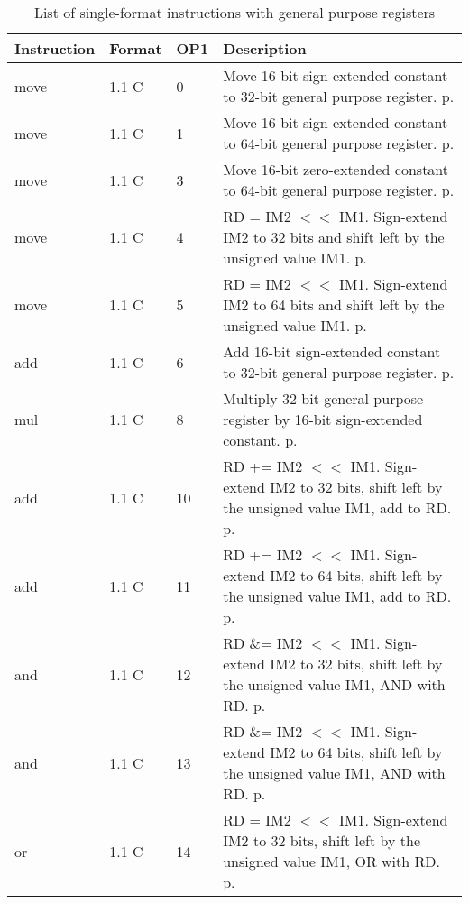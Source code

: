 \documentclass[forwardcom.tex]{subfiles}
\begin{document}
\begin{longtable} {|p{25mm}|p{14mm}|p{10mm}|p{95mm}|}
\caption{List of single-format instructions with general purpose registers} 
\label{table:ListOfSingleFormatInstructionsGP} \\
\endfirsthead
\endhead
\hline
\bfseries Instruction & \bfseries Format &\bfseries OP1 & \bfseries Description \\
\hline
move          & 1.1 C &  0 & Move 16-bit sign-extended constant to 32-bit general purpose register. p. \pageref{table:moveInstruction}\\
move          & 1.1 C &  1 & Move 16-bit sign-extended constant to 64-bit general purpose register. p. \pageref{table:moveInstruction} \\
move          & 1.1 C &  3 & Move 16-bit zero-extended constant to 64-bit general purpose register. p. \pageref{table:moveInstruction} \\
move          & 1.1 C & 4  & RD = IM2 $<<$ IM1. Sign-extend IM2 to 32 bits and shift left by the unsigned value IM1. p. \pageref{table:moveInstruction} \\
move          & 1.1 C & 5  & RD = IM2 $<<$ IM1. Sign-extend IM2 to 64 bits and shift left by the unsigned value IM1. p. \pageref{table:moveInstruction} \\
add           & 1.1 C &  6  & Add 16-bit sign-extended constant to 32-bit general purpose register. p. \pageref{table:addInstruction} \\
mul           & 1.1 C &  8  & Multiply 32-bit general purpose register by 16-bit sign-extended constant. p. \pageref{table:mulInstruction} \\
add           & 1.1 C & 10  & RD += IM2 $<<$ IM1. Sign-extend IM2 to 32 bits, shift left by the unsigned value IM1, add to RD. p. \pageref{table:addInstruction}\\
add           & 1.1 C & 11  & RD += IM2 $<<$ IM1. Sign-extend IM2 to 64 bits, shift left by the unsigned value IM1, add to RD. p. \pageref{table:addInstruction} \\
and           & 1.1 C & 12  & RD \&= IM2 $<<$ IM1. Sign-extend IM2 to 32 bits, shift left by the unsigned value IM1, AND with RD. p. \pageref{table:andInstruction} \\
and           & 1.1 C & 13  & RD \&= IM2 $<<$ IM1. Sign-extend IM2 to 64 bits, shift left by the unsigned value IM1, AND with RD. p. \pageref{table:andInstruction} \\
or            & 1.1 C & 14  & RD \textbar{}= IM2 $<<$ IM1. Sign-extend IM2 to 32 bits, shift left by the unsigned value IM1, OR with RD. p. \pageref{table:orInstruction} \\

\end{longtable}
\end{document}
